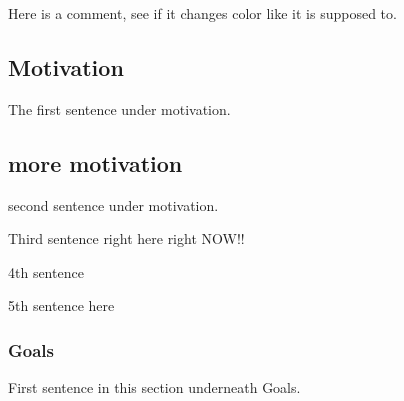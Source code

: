 \documentclass[modern]{CORE-AAS/aastex631}
\begin{document}
{{Here is a comment, see if it changes color like it is supposed to. 
\subsection{Motivation} %
\label{sub:motivation}

The first sentence under motivation. \citep{bernardi+2006aj131_1288}
\subsection{more motivation}
\label{sub:more_motivation}

second sentence under motivation.

Third sentence right here right NOW!! 


4th sentence 

5th sentence here 

\subsubsection{Goals}
\label{subsub:goals}
First sentence in this section underneath Goals. 

}}
\end{document}
